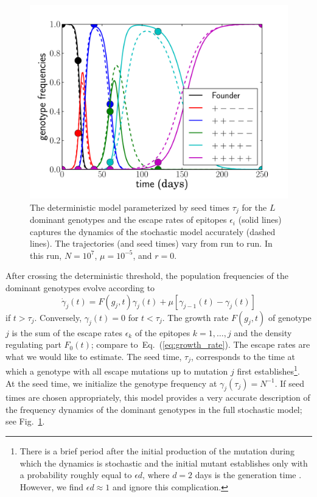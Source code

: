\documentclass{frontiers}
\newcommand{\EQ}[1]{Eq.~(\ref{eq:#1})}
\newcommand{\FIG}[1]{Fig.~\ref{fig:#1}}
\newcommand{\gt}{g}
\newcommand{\gtfreq}{\gamma}
\newcommand{\fcoeff}{\epsilon}
\begin{document}
\begin{figure}[tp]
\begin{center}
  \includegraphics[width=0.45\columnwidth]{figures_manuscript/sequential_traj_illustration.pdf}
  \caption[labelInTOC]{The deterministic model parameterized by seed times
  $\tau_j$ for the $L$ dominant genotypes and the escape rates of
  epitopes $\fcoeff_i$ 
  (solid lines) captures the dynamics of the stochastic model accurately
  (dashed lines). The trajectories (and seed times) vary from run to run. In this run,
$N = 10^7$, $\mu = 10^{-5}$, and $r = 0$.}
  \label{fig:model_vs_full}
\end{center}
\end{figure}

After crossing the deterministic threshold, the population frequencies 
of the dominant genotypes evolve according to
\begin{equation}
\label{eq:gt_dynamics}
\dot \gtfreq_j(t) = F(\gt_j,t)\gtfreq_j(t) +\mu [\gtfreq_{j-1}(t) - \gtfreq_{j}(t)]
\end{equation}
if $t>\tau_j$. Conversely, $\gtfreq_j(t)=0$ for $t<\tau_j$. The growth
rate $F(\gt_j,t)$ of genotype $j$ is the sum of the escape
rates $\fcoeff_k$ of the epitopes $k=1,\ldots,j$ and the density
regulating part $F_0(t)$; compare to~\EQ{growth_rate}. The escape rates are what we would like to
estimate.  The seed time, $\tau_j$, corresponds to the time
at which a genotype with all escape mutations up to mutation $j$ first
establishes\footnote{There is a brief period after the initial
  production of the mutation during which the dynamics is stochastic and
  the initial mutant establishes only with a probability roughly equal
  to $\epsilon d$, where $d=2$ days is the generation time
  \citep{markowitz_novel_2003}. However, we find $\epsilon d\approx 1$ and 
  ignore this complication.}.  At the seed time, we initialize the
genotype frequency at $\gtfreq_j(\tau_j)=N^{-1}$. If seed times are
chosen appropriately, this model provides a very accurate description of
the frequency dynamics of the dominant genotypes in the full stochastic
model; see \FIG{model_vs_full}.
\end{document}
